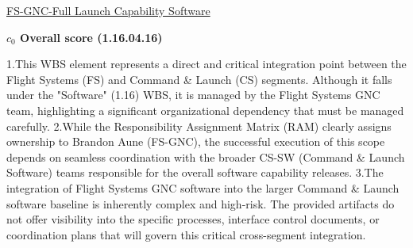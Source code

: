 % 


\begin{frame}{\href{run:../local/source-docs/1.16.04.16.pdf}{FS-GNC-Full Launch Capability Software}}
\centering
{}
\par
\vspace{0.75em}
\textbf{\small{\(c_0\) Overall score {\tiny (1.16.04.16)}}}\\\par
\vspace{0.5em}
\begin{minipage}{0.85\textwidth}
\raggedright
\fontsize{7}{9}\selectfont
1.This WBS element represents a direct and critical integration point between the Flight Systems (FS) and Command \& Launch (CS) segments. Although it falls under the "Software" (1.16) WBS, it is managed by the Flight Systems GNC team, highlighting a significant organizational dependency that must be managed carefully. 2.While the Responsibility Assignment Matrix (RAM) clearly assigns ownership to Brandon Aune (FS-GNC), the successful execution of this scope depends on seamless coordination with the broader CS-SW (Command \& Launch Software) teams responsible for the overall software capability releases. 3.The integration of Flight Systems GNC software into the larger Command \& Launch software baseline is inherently complex and high-risk. The provided artifacts do not offer visibility into the specific processes, interface control documents, or coordination plans that will govern this critical cross-segment integration.\par
\end{minipage}
\end{frame}
